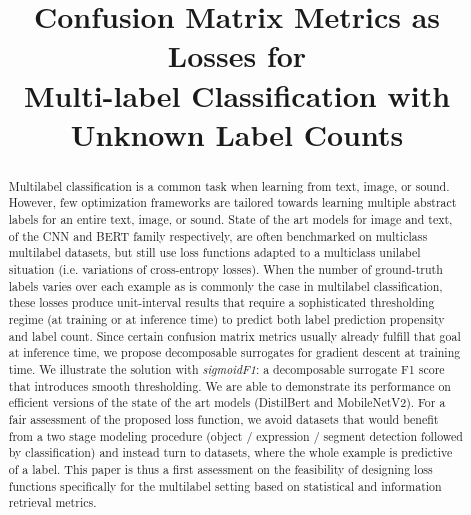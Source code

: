 \documentclass[sigconf,natbib,screen=true,review=true,anonymous]{acmart}
\begin{document}
\title[Confusion Matrix Metrics as Losses for Multi-label Classification]{Confusion Matrix Metrics as Losses for \\ Multi-label Classification with Unknown Label Counts}


\begin{abstract}
  Multilabel classification is a common task when learning from text, image, or sound. However, few optimization frameworks are tailored towards learning multiple abstract labels for an entire text, image, or sound. State of the art models for image and text, of the CNN and BERT family respectively, are often benchmarked on multiclass multilabel datasets, but still use loss functions adapted to a multiclass unilabel situation (i.e. variations of cross-entropy losses). When the number of ground-truth labels varies over each example as is commonly the case in multilabel classification, these losses produce unit-interval results that require a sophisticated thresholding regime (at training or at inference time) to predict both label prediction propensity and label count. Since certain confusion matrix metrics usually already fulfill that goal at inference time, we propose decomposable surrogates for gradient descent at training time. We illustrate the solution with \emph{sigmoidF1}: a decomposable surrogate F1 score that introduces smooth thresholding. We are able to demonstrate its performance on efficient versions of the state of the art models (DistilBert and MobileNetV2). For a fair assessment of the proposed loss function, we avoid datasets that would benefit from a two stage modeling procedure (object / expression / segment detection followed by classification) and instead turn to datasets, where the whole example is predictive of a label. This paper is thus a first assessment on the feasibility of designing loss functions specifically for the multilabel setting based on statistical and information retrieval metrics.
\fi
\end{abstract}
\end{document}
